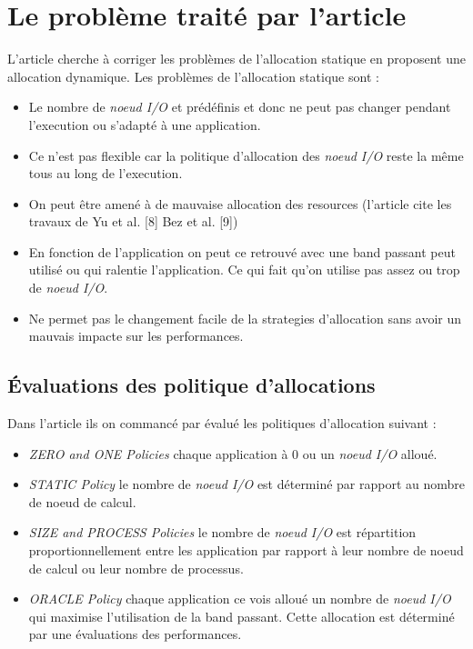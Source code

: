 \documentclass[10pt, a4paper]{article}
\begin{document}
\section{Le problème traité par l'article}

L'article cherche à corriger les problèmes de l'allocation statique en proposent une allocation dynamique.
Les problèmes de l'allocation statique sont :
\begin{itemize}
  \item Le nombre de \emph{noeud I/O} et prédéfinis et donc ne peut pas changer pendant l'execution ou s'adapté à une application.
  \item Ce n'est pas flexible car la politique d'allocation des \emph{noeud I/O} reste la même tous au long de l'execution.
  \item On peut être amené à de mauvaise allocation des resources (l'article cite les travaux de Yu et al. [8] Bez et al. [9])\cite{}
  \item En fonction de l'application on peut ce retrouvé avec une band passant peut utilisé ou qui ralentie l'application. Ce qui fait qu'on utilise pas assez ou trop de \emph{noeud I/O}.
  \item Ne permet pas le changement facile de la strategies d'allocation sans avoir un mauvais impacte sur les performances.
\end{itemize}

\subsection{Évaluations des politique d'allocations}

Dans l'article ils on commancé par évalué les politiques d'allocation suivant :
\begin{itemize}
  \item \emph{ZERO and ONE Policies} chaque application à 0 ou un \emph{noeud I/O} alloué.
  \item \emph{STATIC Policy} le nombre de \emph{noeud I/O} est déterminé par rapport au nombre de noeud de calcul.
  \item \emph{SIZE and PROCESS Policies} le nombre de \emph{noeud I/O} est répartition proportionnellement entre les application par rapport à leur nombre de noeud de calcul ou leur nombre de processus.
  \item \emph{ORACLE Policy} chaque application ce vois alloué un nombre de \emph{noeud I/O} qui maximise l'utilisation de la band passant. Cette allocation est déterminé par une évaluations des performances.
\end{itemize}
\end{document}
